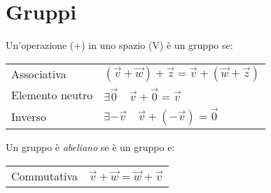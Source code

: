 \section{Gruppi}
Un'operazione (+) in uno spazio (V) è un gruppo se:
\begin{tabular}{ll}
	Associativa & $(\vec{v} + \vec{w}) + \vec{z} = \vec{v} + (\vec{w} + \vec{z})$ \\
	Elemento neutro & $\exists \vec{0} \quad \vec{v} + \vec{0} = \vec{v}$ \\
	Inverso & $\exists -\vec{v} \quad \vec{v} + (-\vec{v}) = \vec{0}$
\end{tabular}

Un gruppo è \emph{abeliano} se è un gruppo e:
\begin{tabular}{ll}
	Commutativa & $\vec{v}+\vec{w} = \vec{w}+\vec{v}$ \\
\end{tabular}
